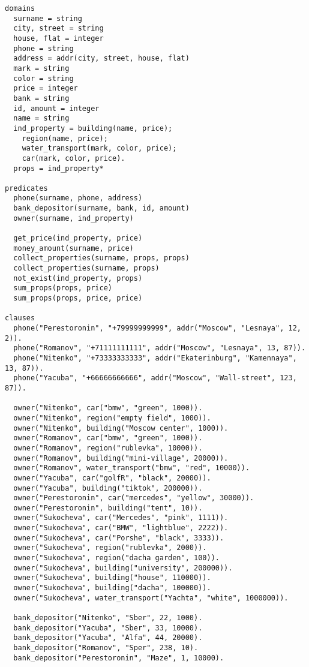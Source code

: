 \begin{lstlisting}
domains
  surname = string
  city, street = string
  house, flat = integer
  phone = string
  address = addr(city, street, house, flat)
  mark = string
  color = string
  price = integer
  bank = string
  id, amount = integer
  name = string
  ind_property = building(name, price);
    region(name, price);
    water_transport(mark, color, price);
    car(mark, color, price).
  props = ind_property*
  
predicates
  phone(surname, phone, address)
  bank_depositor(surname, bank, id, amount)
  owner(surname, ind_property)

  get_price(ind_property, price)
  money_amount(surname, price)
  collect_properties(surname, props, props)
  collect_properties(surname, props)
  not_exist(ind_property, props)
  sum_props(props, price)
  sum_props(props, price, price)
  
clauses
  phone("Perestoronin", "+79999999999", addr("Moscow", "Lesnaya", 12, 2)).
  phone("Romanov", "+71111111111", addr("Moscow", "Lesnaya", 13, 87)).
  phone("Nitenko", "+73333333333", addr("Ekaterinburg", "Kamennaya", 13, 87)).
  phone("Yacuba", "+66666666666", addr("Moscow", "Wall-street", 123, 87)).

  owner("Nitenko", car("bmw", "green", 1000)).
  owner("Nitenko", region("empty field", 1000)).
  owner("Nitenko", building("Moscow center", 1000)).
  owner("Romanov", car("bmw", "green", 1000)).
  owner("Romanov", region("rublevka", 10000)).
  owner("Romanov", building("mini-village", 20000)).
  owner("Romanov", water_transport("bmw", "red", 10000)).
  owner("Yacuba", car("golfR", "black", 20000)).
  owner("Yacuba", building("tiktok", 200000)).
  owner("Perestoronin", car("mercedes", "yellow", 30000)).
  owner("Perestoronin", building("tent", 10)).
  owner("Sukocheva", car("Mercedes", "pink", 1111)).
  owner("Sukocheva", car("BMW", "lightblue", 2222)).
  owner("Sukocheva", car("Porshe", "black", 3333)).
  owner("Sukocheva", region("rublevka", 2000)).
  owner("Sukocheva", region("dacha garden", 100)).
  owner("Sukocheva", building("university", 200000)).
  owner("Sukocheva", building("house", 110000)).
  owner("Sukocheva", building("dacha", 100000)).
  owner("Sukocheva", water_transport("Yachta", "white", 1000000)).

  bank_depositor("Nitenko", "Sber", 22, 1000).
  bank_depositor("Yacuba", "Sber", 33, 10000).
  bank_depositor("Yacuba", "Alfa", 44, 20000).
  bank_depositor("Romanov", "Sper", 238, 10).
  bank_depositor("Perestoronin", "Maze", 1, 10000).


\end{lstlisting}
